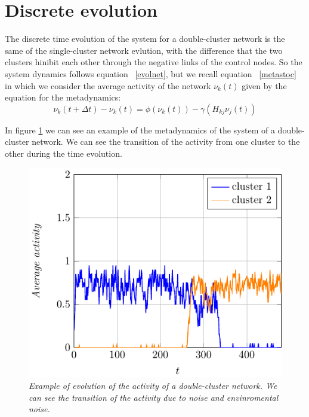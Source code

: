 \section{Discrete evolution}
The discrete time evolution of the system for a double-cluster network is the same of the single-cluster network evlution, with the difference that the two clusters hinibit each other through the negative links of the control nodes.
So the system dynamics follows equation ~\eqref{evolnet}, but we recall equation ~\eqref{metastoc} in which we consider the average activity of the network $\nu_k(t)$ given by the equation for the metadynamics:
$$
\nu_k(t+\Delta t)-\nu_k(t)=\phi(\nu_k(t))-\gamma\left (H_{kj}\nu_j(t)\right )
$$

In figure \ref{fig:metad} we can see an example of the metadynamics of the system of a double-cluster network. We can see the transition of the activity from one cluster to the other during the time evolution.
\begin{figure}[H]
\centering
\includegraphics[scale=1.2]{images/metad.pdf}
\caption{\emph{Example of evolution of the activity of a double-cluster network. We can see the transition of the activity due to noise and envinromental noise.}}
\label{fig:metad}
\end{figure}


